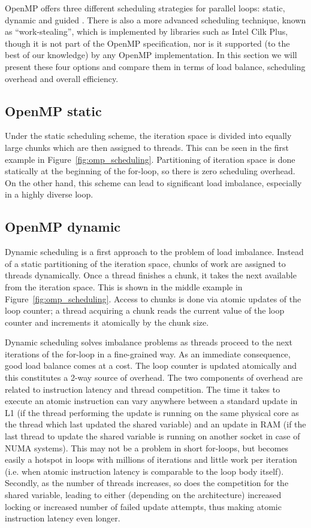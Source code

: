 \documentclass{acm_proc_article-sp}
\newcommand{\Figref}[1]{Figure~\ref{#1}}
\begin{document}
OpenMP offers three different scheduling strategies for parallel loops: static, 
dynamic and guided \cite{openmp:spec40}. There is also a more advanced
scheduling technique, known as ``work-stealing'', which is implemented by
libraries such as Intel Cilk Plus, though it is not part of the OpenMP
specification, nor is it supported (to the best of our knowledge) by any OpenMP
implementation. In this section we will present these four options and compare
them in terms of load balance, scheduling overhead and overall efficiency.

\subsection{OpenMP static}
\label{subsect:omp_static}
Under the static scheduling scheme, the iteration space is divided into equally 
large chunks which are then assigned to threads. This can be seen in the first 
example in \Figref{fig:omp_scheduling}. Partitioning of iteration space is done 
statically at the beginning of the for-loop, so there is zero scheduling 
overhead. On the other hand, this scheme can lead to significant load 
imbalance, especially in a highly diverse loop.

\subsection{OpenMP dynamic}
\label{subsect:omp_dynamic}
Dynamic scheduling is a first approach to the problem of load imbalance. 
Instead of a static partitioning of the iteration space, chunks of work are 
assigned to threads dynamically. Once a thread finishes a chunk, it takes the 
next available from the iteration space. This is shown in the middle example in 
\Figref{fig:omp_scheduling}. Access to chunks is done via atomic updates of the 
loop counter; a thread acquiring a chunk reads the current value of the loop 
counter and increments it atomically by the chunk size.

Dynamic scheduling solves imbalance problems as threads proceed to the next 
iterations of the for-loop in a fine-grained way. As an immediate consequence, 
good load balance comes at a cost. The loop counter is updated atomically and 
this constitutes a 2-way source of overhead. The two components of overhead are 
related to instruction latency and thread competition. The time it takes to 
execute an atomic instruction can vary anywhere between a standard update in L1 
(if the thread performing the update is running on the same physical core as 
the thread which last updated the shared variable) and an update in RAM (if the 
last thread to update the shared variable is running on another socket in case 
of NUMA systems). This may not be a problem in short for-loops, but becomes 
easily a hotspot in loops with millions of iterations and little work per 
iteration (i.e. when atomic instruction latency is comparable to the loop body 
itself). Secondly, as the number of threads increases, so does the competition 
for the shared variable, leading to either (depending on the architecture) 
increased locking or increased number of failed update attempts, thus making 
atomic instruction latency even longer.
\end{document}
